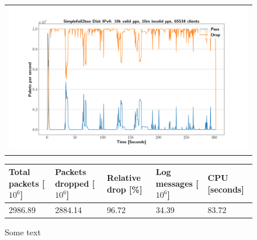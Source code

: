 \begin{figure}[p]
	\label{fig:simplefail2ban:disk:ip4:10m}
	\centering
	\scriptsize
	\begin{tabular}{c}
    	\centerline{\includegraphics[width=1.2\textwidth]{images/simplefail2ban_disk_ipv4_v10k_iv10m_c65534.png}}
	\end{tabular}
	\begin{tabular}{lllll}
		\toprule
		\textbf{Total packets [$10^6$]} & \textbf{Packets dropped [$10^6$]} & \textbf{Relative drop [\%]} & \textbf{Log messages [$10^6$]} & \textbf{CPU [seconds]} \\ \midrule 
		2986.89 & 2884.14 & 96.72 & 34.39 & 83.72 \\
		\bottomrule
	\end{tabular}
	\caption[Simplefail2ban Logfile IPv4 10m PPS]{Some text}
\end{figure}

